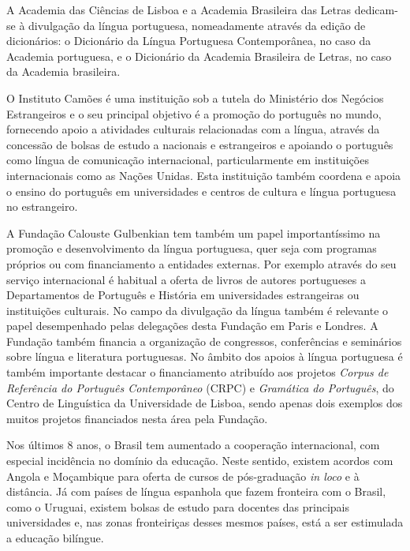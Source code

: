 \begin{multicols}{2}
 A Academia das Ciências de Lisboa e a Academia Brasileira das Letras dedicam-se à divulgação da língua portuguesa, nomeadamente através da edição de dicionários: o Dicionário da Língua Portuguesa Contemporânea, no caso da Academia portuguesa, e o Dicionário da Academia Brasileira de Letras, no caso da Academia brasileira. 

O Instituto Camões é uma instituição sob a tutela do Ministério dos Negócios Estrangeiros e o seu principal objetivo é a promoção do português no mundo, fornecendo apoio a atividades culturais relacionadas com a língua, através da concessão de bolsas de estudo a nacionais e estrangeiros e apoiando o português como língua de comunicação internacional, particularmente em instituições internacionais como as Nações Unidas. Esta instituição também coordena e apoia o ensino do português em universidades e centros de cultura e língua portuguesa no estrangeiro.


A Fundação Calouste Gulbenkian\cite{gulbenkian} tem também um papel importantíssimo na promoção e desenvolvimento da língua portuguesa, quer seja com programas próprios ou com financiamento a entidades externas. Por exemplo através do seu serviço internacional é habitual a oferta de livros de autores portugueses a Departamentos de Português e História em universidades estrangeiras ou instituições culturais. No campo da divulgação da língua também é relevante o papel desempenhado pelas delegações desta Fundação em Paris e Londres. A Fundação também financia a organização de congressos, conferências e seminários sobre língua e literatura portuguesas. No âmbito dos apoios à língua portuguesa é também importante destacar o financiamento atribuído aos projetos \textit{Corpus de Referência do Português Contemporâneo} (CRPC) e \textit{Gramática do Português}, do Centro de Linguística da Universidade de Lisboa, sendo apenas dois exemplos dos muitos projetos financiados nesta área pela Fundação.

Nos últimos 8 anos, o Brasil tem aumentado a cooperação internacional, com especial incidência no domínio da educação. Neste sentido, existem acordos com Angola e Moçambique para oferta de cursos de pós-graduação \textit{in loco} e à distância. Já com países de língua espanhola que fazem fronteira com o Brasil, como o Uruguai, existem bolsas de estudo para docentes das principais universidades e, nas zonas fronteiriças desses mesmos países, está a ser estimulada a educação bilíngue.


\end{multicols}
